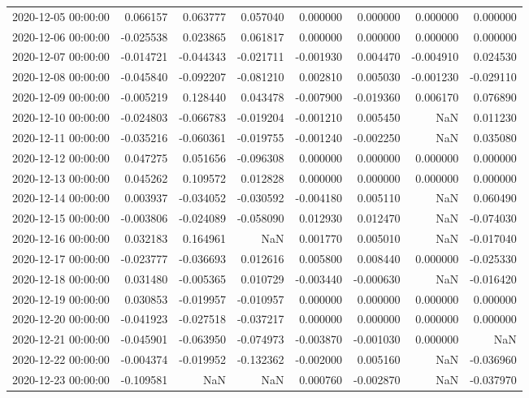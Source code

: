 \begin{tabular}{lrrrrrrr}
2020-12-05 00:00:00 & 0.066157 & 0.063777 & 0.057040 & 0.000000 & 0.000000 & 0.000000 & 0.000000 \\
2020-12-06 00:00:00 & -0.025538 & 0.023865 & 0.061817 & 0.000000 & 0.000000 & 0.000000 & 0.000000 \\
2020-12-07 00:00:00 & -0.014721 & -0.044343 & -0.021711 & -0.001930 & 0.004470 & -0.004910 & 0.024530 \\
2020-12-08 00:00:00 & -0.045840 & -0.092207 & -0.081210 & 0.002810 & 0.005030 & -0.001230 & -0.029110 \\
2020-12-09 00:00:00 & -0.005219 & 0.128440 & 0.043478 & -0.007900 & -0.019360 & 0.006170 & 0.076890 \\
2020-12-10 00:00:00 & -0.024803 & -0.066783 & -0.019204 & -0.001210 & 0.005450 & NaN & 0.011230 \\
2020-12-11 00:00:00 & -0.035216 & -0.060361 & -0.019755 & -0.001240 & -0.002250 & NaN & 0.035080 \\
2020-12-12 00:00:00 & 0.047275 & 0.051656 & -0.096308 & 0.000000 & 0.000000 & 0.000000 & 0.000000 \\
2020-12-13 00:00:00 & 0.045262 & 0.109572 & 0.012828 & 0.000000 & 0.000000 & 0.000000 & 0.000000 \\
2020-12-14 00:00:00 & 0.003937 & -0.034052 & -0.030592 & -0.004180 & 0.005110 & NaN & 0.060490 \\
2020-12-15 00:00:00 & -0.003806 & -0.024089 & -0.058090 & 0.012930 & 0.012470 & NaN & -0.074030 \\
2020-12-16 00:00:00 & 0.032183 & 0.164961 & NaN & 0.001770 & 0.005010 & NaN & -0.017040 \\
2020-12-17 00:00:00 & -0.023777 & -0.036693 & 0.012616 & 0.005800 & 0.008440 & 0.000000 & -0.025330 \\
2020-12-18 00:00:00 & 0.031480 & -0.005365 & 0.010729 & -0.003440 & -0.000630 & NaN & -0.016420 \\
2020-12-19 00:00:00 & 0.030853 & -0.019957 & -0.010957 & 0.000000 & 0.000000 & 0.000000 & 0.000000 \\
2020-12-20 00:00:00 & -0.041923 & -0.027518 & -0.037217 & 0.000000 & 0.000000 & 0.000000 & 0.000000 \\
2020-12-21 00:00:00 & -0.045901 & -0.063950 & -0.074973 & -0.003870 & -0.001030 & 0.000000 & NaN \\
2020-12-22 00:00:00 & -0.004374 & -0.019952 & -0.132362 & -0.002000 & 0.005160 & NaN & -0.036960 \\
2020-12-23 00:00:00 & -0.109581 & NaN & NaN & 0.000760 & -0.002870 & NaN & -0.037970 \\

\end{tabular}
